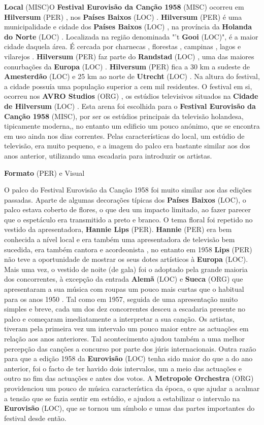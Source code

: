 \documentclass[12pt,a4paper]{article}
\begin{document}
\textbf{Local} (MISC)O \textbf{Festival Eurovisão da Canção 1958} (MISC) ocorreu em \textbf{Hilversum} (PER) , nos \textbf{Países Baixos} (LOC) . \textbf{Hilversum} (PER) é uma municipalidade e cidade dos \textbf{Países Baixos} (LOC) , na província da \textbf{Holanda do Norte} (LOC) . Localizada na região denominada "'t \textbf{Gooi} (LOC)", é a maior cidade daquela área. É cercada por charnecas , florestas , campinas , lagos e vilarejos . \textbf{Hilversum} (PER) faz parte do \textbf{Randstad} (LOC) , uma das maiores conurbações da \textbf{Europa} (LOC) . \textbf{Hilversum} (PER) fica a 30 km a sudeste de \textbf{Amesterdão} (LOC) e 25 km ao norte de \textbf{Utrecht} (LOC) . Na altura do festival, a cidade possuía uma população superior a cem mil residentes. O festival em si, ocorreu nos \textbf{AVRO Studios} (ORG) , os estúdios televisivos situados na \textbf{Cidade de Hilversum} (LOC) . Esta arena foi escolhida para o \textbf{Festival Eurovisão da Canção 1958} (MISC), por ser os estúdios principais da televisão holandesa, tipicamente moderna,, no entanto um edificio um pouco anónimo, que se encontra em uso ainda nos dias correntes. Pelas características do local, um estúdio de televisão, era muito pequeno, e a imagem do palco era bastante similar aos dos anos anterior, utilizando uma escadaria para introduzir os artistas.



\textbf{Formato} (PER) e Visual

O palco do Festival Eurovisão da Canção 1958 foi muito similar aos das edições passadas. Aparte de algumas decorações típicas dos \textbf{Países Baixos} (LOC), o palco estava coberto de flores, o que deu um impacto limitado, ao fazer parecer que o espetáculo era transmitido a preto e branco. O tema floral foi repetido no vestido da apresentadora, \textbf{Hannie Lips} (PER). \textbf{Hannie} (PER) era bem conhecida a nível local e era também uma apresentadora de televisão bem sucedida, era também cantora e acordeonista , no entanto em 1958 \textbf{Lips} (PER) não teve a oportunidade de mostrar os seus dotes artísticos à \textbf{Europa} (LOC). Mais uma vez, o vestido de noite (de gala) foi o adoptado pela grande maioria dos concorrentes, à excepção da entrada \textbf{Alemã} (LOC) e \textbf{Sueca} (ORG) que apresentaram a sua música com roupas um pouco mais curtas que o habitual para os anos 1950 . Tal como em 1957, seguida de uma apresentação muito simples e breve, cada um dos dez concorrentes desceu a escadaria presente no palco e começaram imediatamente a interpretar a sua canção. Os artistas, tiveram pela primeira vez um intervalo um pouco maior entre as actuações em relação aos anos anteriores. Tal acontecimento ajudou também a uma melhor percepção das canções a concurso por parte dos júris internacionais. Outra razão para que a edição 1958 da \textbf{Eurovisão} (LOC) tenha sido maior do que a do ano anterior, foi o facto de ter havido dois intervalos, um a meio das actuações e outro no fim das actuações e antes dos votos. A \textbf{Metropole Orchestra} (ORG) providenciou um pouco de música característica da época, o que ajudar a acalmar a tensão que se fazia sentir em estúdio, e ajudou a estabilizar o intervalo na \textbf{Eurovisão} (LOC), que se tornou um símbolo e umas das partes importantes do festival desde então.
\end{document}
